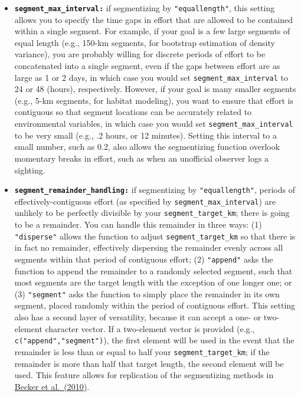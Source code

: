 \documentclass[
]{book}
\begin{document}
\begin{itemize}
\item
  \textbf{\texttt{segment\_max\_interval:}} if segmentizing by \texttt{"equallength"}, this setting allows you to specify the time gaps in effort that are allowed to be contained within a single segment. For example, if your goal is a few large segments of equal length (e.g., 150-km segments, for bootstrap estimation of density variance), you are probably willing for discrete periods of effort to be concatenated into a single segment, even if the gaps between effort are as large as 1 or 2 days, in which case you would set \texttt{segment\_max\_interval} to 24 or 48 (hours), respectively. However, if your goal is many smaller segments (e.g., 5-km segments, for habitat modeling), you want to ensure that effort is contiguous so that segment locations can be accurately related to environmental variables, in which case you would set \texttt{segment\_max\_interval} to be very small (e.g., .2 hours, or 12 minutes). Setting this interval to a small number, such as 0.2, also allows the segmentizing function overlook momentary breaks in effort, such as when an unofficial observer logs a sighting.
\item
  \textbf{\texttt{segment\_remainder\_handling:}} if segmentizing by \texttt{"equallength"}, periods of effectively-contiguous effort (as specified by \texttt{segment\_max\_interval}) are unlikely to be perfectly divisible by your \texttt{segment\_target\_km}; there is going to be a remainder. You can handle this remainder in three ways: (1) \texttt{"disperse"} allows the function to adjust \texttt{segment\_target\_km} so that there is in fact no remainder, effectively dispersing the remainder evenly across all segments within that period of contiguous effort; (2) \texttt{"append"} asks the function to append the remainder to a randomly selected segment, such that most segments are the target length with the exception of one longer one; or (3) \texttt{"segment"} asks the function to simply place the remainder in its own segment, placed randomly within the period of contiguous effort. This setting also has a second layer of versatility, because it can accept a one- or two-element character vector. If a two-element vector is provided (e.g., \texttt{c("append","segment")}), the first element will be used in the event that the remainder is less than or equal to half your \texttt{segment\_target\_km}; if the remainder is more than half that target length, the second element will be used. This feature allows for replication of the segmentizing methods in \href{https://www.int-res.com/abstracts/meps/v413/p163-183/}{Becker et al.~(2010)}.
\end{itemize}
\end{document}
